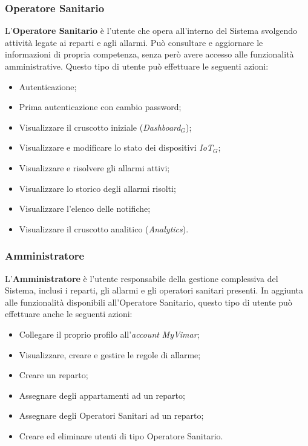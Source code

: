 \documentclass[10pt, letterpaper]{article}
\newcommand{\os}{Operatore Sanitario\xspace}
\newcommand{\admin}{Amministratore\xspace}
\begin{document}
\subsubsection{Operatore Sanitario}
L'\textbf{\os} è l'utente che opera all'interno del Sistema svolgendo attività legate ai reparti e agli allarmi. Può consultare e aggiornare le informazioni di propria competenza, senza però avere accesso alle funzionalità amministrative.
Questo tipo di utente può effettuare le seguenti azioni:
\begin{itemize}
    \item Autenticazione;
    \item Prima autenticazione con cambio password;
    \item Visualizzare il cruscotto iniziale (\textit{Dashboard}${_G}$);
    \item Visualizzare e modificare lo stato dei dispositivi \textit{IoT}${_G}$;
    \item Visualizzare e risolvere gli allarmi attivi;
    \item Visualizzare lo storico degli allarmi risolti;
    \item Visualizzare l'elenco delle notifiche;
    \item Visualizzare il cruscotto analitico (\textit{Analytics}).
\end{itemize}

\subsubsection{Amministratore}
L'\textbf{\admin} è l'utente responsabile della gestione complessiva del Sistema, inclusi i reparti, gli allarmi e gli operatori sanitari presenti.
In aggiunta alle funzionalità disponibili all'\os, questo tipo di utente può effettuare anche le seguenti azioni:
\begin{itemize}
    \item Collegare il proprio profilo all'\textit{account} \textit{MyVimar};
    \item Visualizzare, creare e gestire le regole di allarme;
    \item Creare un reparto;
    \item Assegnare degli appartamenti ad un reparto;
    \item Assegnare degli Operatori Sanitari ad un reparto;
    \item Creare ed eliminare utenti di tipo \os.
\end{itemize}
\end{document}
